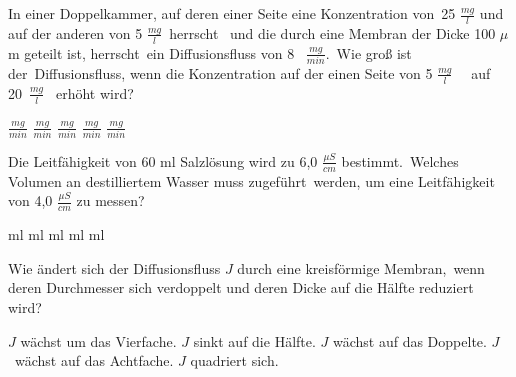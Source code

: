 \documentclass[11pt]{exam}
\begin{document}
\setlength{\voffset}{-0.5in}
\setlength{\headsep}{5pt}

\hspace{2mm}
 \hspace{5mm}
\vspace{4mm}

\begin{questions}

\question In einer Doppelkammer, auf deren einer Seite eine Konzentration von 25 \(\frac{mg}{l} \) und auf der anderen von 5 \(  \frac{mg}{l} \) herrscht  und die durch eine Membran der Dicke 100 \(\mu \)m geteilt ist, herrscht ein Diffusionsfluss von 8  \( \frac{mg}{min}\). Wie groß ist der Diffusionsfluss, wenn die Konzentration auf der einen Seite von 5 \(  \frac{mg}{l} \)   auf 20 \(  \frac{mg}{l} \)  erhöht wird?

\begin{choices}
	 \( \frac{mg}{min} \)
	 \( \frac{mg}{min} \)
	 \( \frac{mg}{min} \)
	 \( \frac{mg}{min} \)
	 \( \frac{mg}{min} \)
\end{choices}

\vspace{3mm}\question Die Leitfähigkeit von 60 ml Salzlösung wird zu 6,0 \( \frac{\mu S}{cm} \) bestimmt. Welches Volumen an destilliertem Wasser muss zugeführt werden, um eine Leitfähigkeit von 4,0 \( \frac{\mu S}{cm} \) zu messen?

\begin{choices}
	 ml
	 ml
	 ml
	 ml
	 ml
\end{choices}

\vspace{3mm}\question Wie ändert sich der Diffusionsfluss \( J \) durch eine kreisförmige Membran, wenn deren Durchmesser sich verdoppelt und deren Dicke auf die Hälfte reduziert wird?

\begin{choices}
	\choice \( J \) wächst um das Vierfache.
	\choice \( J \) sinkt auf die Hälfte.
	\choice \( J \) wächst auf das Doppelte.
	\choice \( J \) wächst auf das Achtfache.
	\choice \( J \) quadriert sich.
\end{choices}


\end{questions}
\end{document}
